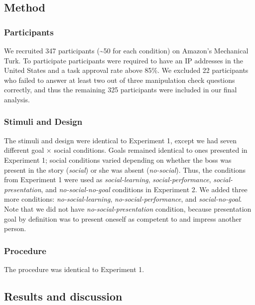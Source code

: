 \documentclass[10pt, letterpaper]{article}
\begin{document}
\subsection{Method}\label{method-1}

\subsubsection{Participants}\label{participants-1}

We recruited 347 participants (\textasciitilde{}50 for each condition)
on Amazon's Mechanical Turk. To participate participants were required
to have an IP addresses in the United States and a task approval rate
above 85\%. We excluded 22 participants who failed to answer at least
two out of three manipulation check questions correctly, and thus the
remaining 325 participants were included in our final analysis.

\subsubsection{Stimuli and Design}\label{stimuli-and-design-1}

The stimuli and design were identical to Experiment 1, except we had
seven different goal \(\times\) social conditions. Goals remained
identical to ones presented in Experiment 1; social conditions varied
depending on whether the boss was present in the story (\emph{social})
or she was absent (\emph{no-social}). Thus, the conditions from
Experiment 1 were used as \emph{social-learning},
\emph{social-performance}, \emph{social-presentation}, and
\emph{no-social-no-goal} conditions in Experiment 2. We added three more
conditions: \emph{no-social-learning}, \emph{no-social-performance}, and
\emph{social-no-goal}. Note that we did not have
\emph{no-social-presentation} condition, because presentation goal by
definition was to present oneself as competent to and impress another
person.

\subsubsection{Procedure}\label{procedure-1}

The procedure was identical to Experiment 1.

\subsection{Results and discussion}\label{results-and-discussion-1}
\end{document}
